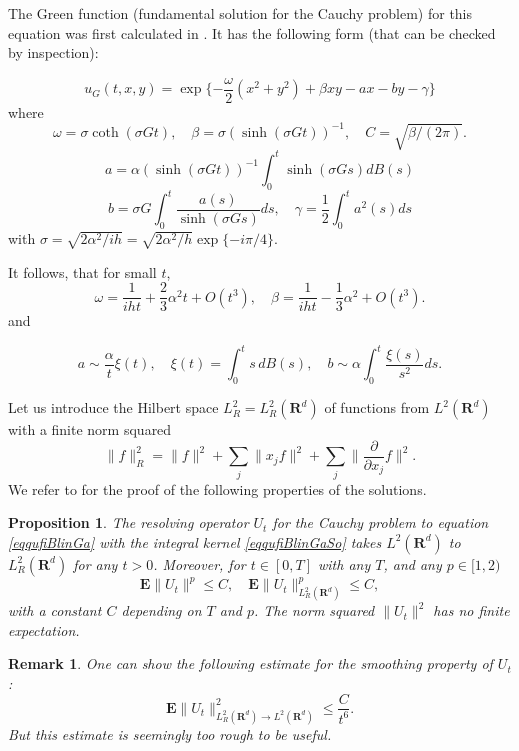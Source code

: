 \documentclass[12pt]{article}
\def\E{\mathbf{E}}
\def\R{\mathbf{R}}
\def\al{\alpha}
\def\be{\beta}
\def\pa{\partial}
\def\ga{\gamma}
\newtheorem{prop}{Proposition}[section]
\newtheorem{remark}{Remark}
\newcommand{\si}{\sigma}
\newcommand{\om}{\omega}
\begin{document}
The Green function (fundamental solution for the Cauchy problem) for this equation was first calculated
in \cite{Kol95}. It has the following form (that can be checked by inspection):

\begin{equation}
\label{eqqufiBlinGaSo}
u_G(t,x,y)=\exp\{-\frac{\om}{2} (x^2+y^2) +\be xy -a x -b y -\ga \}
\end{equation}
where
\[
\om=\si \coth (\si Gt), \quad
\be=\si (\sinh(\si G t))^{-1}, \quad C=\sqrt{\be/(2\pi)}.
\]
\[
a= \al (\sinh(\si G t))^{-1}\int_0^t  \sinh(\si G s) dB(s)
\]
\[
b=\si G \int_0^t \frac{a(s)}{\sinh(\si G s)} ds,
\quad \ga=\frac12 \int_0^t a^2(s)ds
\]
with
$\si=\sqrt{2\al^2/ih}=\sqrt{2\al^2/h} \exp\{-i\pi/4\}$.

It follows, that for small $t$,
\[
\om=\frac{1}{iht} +\frac23 \al^2 t +O(t^3), \quad
\be=\frac{1}{iht}-\frac13 \al^2 +O(t^3).
\]
and

\begin{equation}
\label{asympstochosc}
a \sim \frac{\al}{t} \xi(t), \quad \xi(t)=\int_0^t s \, dB(s), \quad
b \sim \al \int_0^t \frac{\xi(s)}{s^2} ds.
\end{equation}

Let us introduce
the Hilbert space $L^2_R=L^2_R(\R^d)$ of functions from $L^2(\R^d)$ with
a finite norm squared
\[
\|f\|^2_R =\|f\|^2+\sum_j\|x_jf\|^2+\sum_j \|\frac{\pa}{\pa x_j} f\|^2.
\]
We refer to \cite{Kol25b} for the proof of the following properties of the solutions.

\begin{prop}
\label{propsmoo}
The resolving operator $U_t$ for the Cauchy problem to equation \eqref{eqqufiBlinGa}
with the integral kernel \eqref{eqqufiBlinGaSo} takes $L^2(\R^d)$ to $L^2_R(\R^d)$
for any $t>0$. Moreover, for $t\in [0,T]$ with any $T$, and any $p\in [1,2)$
\begin{equation}
\label{eqpropsmoo}
\E \|U_t\|^p \le C, \quad  \E \|U_t\|^p_{L^2_R(\R^d)} \le C,
\end{equation}
with a constant $C$ depending on $T$ and $p$. The norm squared $\|U_t\|^2$ has no finite expectation.
\end{prop}


\begin{remark}
One can show the following estimate for the smoothing property of $U_t$:
\[
 \E\|U_t \|^2_{L^2_R(\R^d)\to L^2(\R^d)} \le \frac{C}{t^6}.
\]
But  this estimate is seemingly too rough to be useful.
\end{remark}
\end{document}
